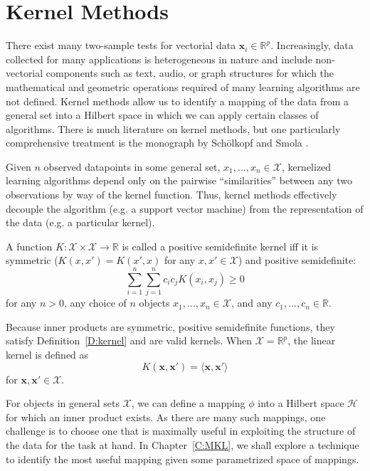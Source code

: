 \section{Kernel Methods}
There exist many two-sample tests for vectorial data $\mathbf{x}_i \in \mathbb{R}^p$.
Increasingly, data collected for many applications is heterogeneous in nature
and include non-vectorial components such as text, audio, or graph structures
for which the mathematical and geometric operations required of many learning
algorithms are not defined.  Kernel methods allow us to identify a mapping
of the data from a general set into a Hilbert space in which we can apply
certain classes of algorithms.  There is much literature on kernel methods,
but one particularly comprehensive treatment is the monograph by Sch{\"o}lkopf
and Smola \cite{scholkopf2002learning}.

Given $n$ observed datapoints in some general set, $x_1, \ldots, x_n \in \mathcal{X}$,
kernelized learning algorithms depend only on the pairwise ``similarities'' between
any two observations by way of the kernel function.  Thus, kernel methods effectively
decouple the algorithm (e.g. a support vector machine) from the representation
of the data (e.g. a particular kernel).
\begin{definition}
\label{D:kernel}
A function $K: \mathcal{X} \times \mathcal{X} \to \mathbb{R}$ is called a positive
semidefinite kernel iff it is symmetric ($K(x, x') = K(x', x)$ for any
$x, x' \in \mathcal{X}$) and positive semidefinite:
\begin{equation*}
  \sum_{i=1}^n\sum_{j=1}^nc_ic_jK(x_i, x_j) \geq 0
\end{equation*}
for any $n > 0$, any choice of $n$ objects $x_1, \ldots, x_n \in \mathcal{X}$,
and any $c_1, \ldots, c_n \in \mathbb{R}$.
\end{definition}

Because inner products are symmetric, positive semidefinite functions, they
satisfy Definition~\ref{D:kernel} and are valid kernels.  When $\mathcal{X} = \mathbb{R}^p$,
the linear kernel is defined as
\begin{equation*}
  K(\mathbf{x}, \mathbf{x'}) = \langle \mathbf{x}, \mathbf{x'} \rangle
\end{equation*}
for $\mathbf{x}, \mathbf{x'} \in \mathcal{X}$.

For objects in general sets $\mathcal{X}$, we can define a mapping $\phi$ into a
Hilbert space $\mathcal{H}$ for which an inner product exists.  As there are
many such mappings, one challenge is to choose one that is maximally
useful in exploiting the structure of the data for the task at hand.  In
Chapter~\ref{C:MKL}, we shall explore a technique to identify the most useful
mapping given some parametrized space of mappings.

